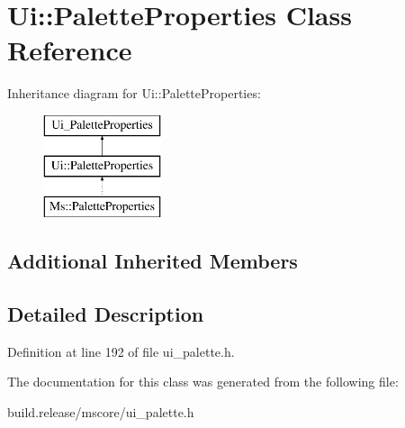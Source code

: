 \hypertarget{class_ui_1_1_palette_properties}{}\section{Ui\+:\+:Palette\+Properties Class Reference}
\label{class_ui_1_1_palette_properties}
Inheritance diagram for Ui\+:\+:Palette\+Properties\+:\begin{figure}[H]
\begin{center}
\leavevmode
\includegraphics[height=3.000000cm]{class_ui_1_1_palette_properties}
\end{center}
\end{figure}
\subsection*{Additional Inherited Members}


\subsection{Detailed Description}


Definition at line 192 of file ui\+\_\+palette.\+h.



The documentation for this class was generated from the following file\+:\begin{DoxyCompactItemize}
\item 
build.\+release/mscore/ui\+\_\+palette.\+h\end{DoxyCompactItemize}
